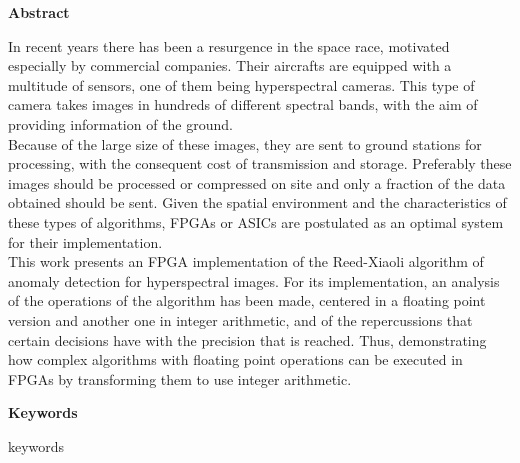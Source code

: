 
\newpage

\thispagestyle{empty}

\begin{center}

{\bf \Huge Abstract}

  \end{center}
\vspace{1cm}
In recent years there has been a resurgence in the space race, motivated especially by commercial companies. Their aircrafts are equipped with a multitude of sensors, one of them being hyperspectral cameras. This type of camera takes images in hundreds of different spectral bands, with the aim of providing information of the ground.
\\
Because of the large size of these images, they are sent to ground stations for processing, with the consequent cost of transmission and storage. Preferably these images should be processed or compressed on site and only a fraction of the data obtained should be sent. Given the spatial environment and the characteristics of these types of algorithms, FPGAs or ASICs are postulated as an optimal system for their implementation.
\\
This work presents an FPGA implementation of the Reed-Xiaoli algorithm of anomaly detection for hyperspectral images. For its implementation, an analysis of the operations of the algorithm has been made, centered in a floating point version and another one in integer arithmetic, and of the repercussions that certain decisions have with the precision that is reached.
Thus, demonstrating how complex algorithms with floating point operations can be executed in FPGAs by transforming them to use integer arithmetic.

\vspace{1cm}

\begin{center}

{\bf \Large Keywords}

   \end{center}

   \vspace{0.5cm}
   
   keywords
   


